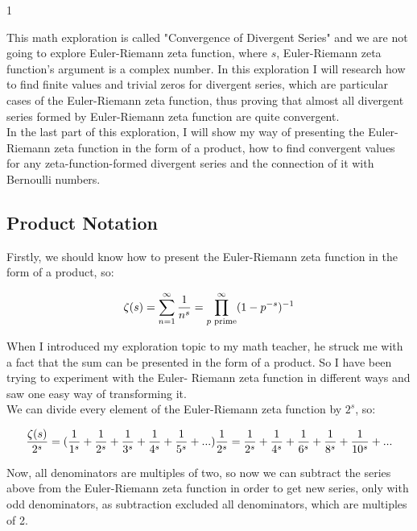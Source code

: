 1\documentclass[a4paper]{article}
\begin{document}
This math exploration is called "Convergence of Divergent Series" and we are not going to explore
Euler-Riemann zeta function, where $s$, Euler-Riemann zeta function's argument is a complex
number. In this exploration I will research how to find finite values and trivial zeros for divergent
series, which are particular cases of the Euler-Riemann zeta function, thus proving that almost all
divergent series formed by Euler-Riemann zeta function are quite convergent.\\

In the last part of this exploration, I will show my way of presenting the Euler-Riemann zeta
function in the form of a product, how to find convergent values for any zeta-function-formed
divergent series and the connection of it with Bernoulli numbers.

\subsection{Product Notation}

Firstly, we should know how to present the Euler-Riemann zeta function in the form of a product,
so:

\begin{equation}
  \zeta(s)=\sum_{n=1}^{\infty} \frac{1}{n^s}=\prod_{p \text{ prime}}^{\infty} (1-p^{-s})^{-1}\\
\end{equation}

When I introduced my exploration topic to my math teacher, he struck me with a fact that the sum
can be presented in the form of a product. So I have been trying to experiment with the Euler-
Riemann zeta function in different ways and saw one easy way of transforming it.\\

We can divide every element of the Euler-Riemann zeta function by $2^s$, so:

\begin{equation*}
  \frac{\zeta(s)}{2^s}= (\frac{1}{1^s}+\frac{1}{2^s}+\frac{1}{3^s}+
  \frac{1}{4^s}+\frac{1}{5^s}+...)\frac{1}{2^s}=
  \frac{1}{2^s}+\frac{1}{4^s}+\frac{1}{6^s}+
  \frac{1}{8^s}+\frac{1}{10^s}+...\\
  \end{equation*}

Now, all denominators are multiples of two, so now we can subtract the series above from the
Euler-Riemann zeta function in order to get new series, only with odd denominators, as subtraction
excluded all denominators, which are multiples of 2.
\end{document}
